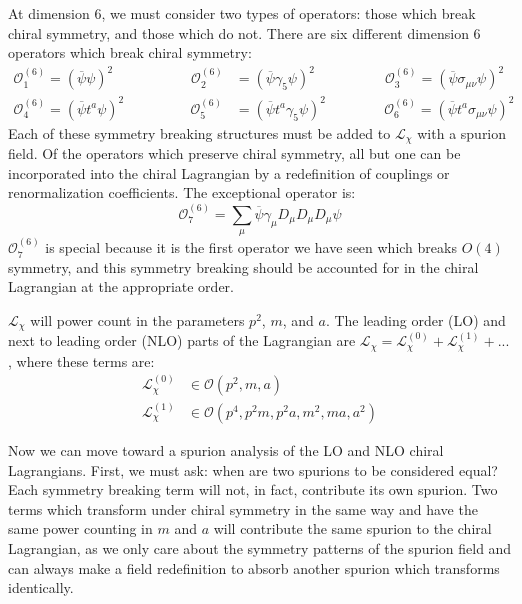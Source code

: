 \documentclass[11pt, oneside]{article}   	%
\theoremstyle{definition}
\begin{document}
At dimension 6, we must consider two types of operators: those which break chiral symmetry, and those which do not. 
There are six different dimension 6 operators which break chiral symmetry:
\begin{align}
        \mathcal O_1^{(6)} = (\overline\psi\psi)^2 \;\;\;\;\;\;\;\;\;\;\;\;\;\;\;\;\;\;\;\; \mathcal O_2^{(6)} &= 
        (\overline\psi\gamma_5\psi)^2\;\;\;\;\;\;\;\;\;\;\;\;\;\;\;\;\;\; \mathcal O_3^{(6)} = (\overline\psi\sigma_{\mu\nu}\psi)^2 
        \nonumber \\ 
        \mathcal O_4^{(6)} = (\overline\psi t^a \psi)^2 \;\;\;\;\;\;\;\;\;\;\;\;\;\;\;\;\;  \mathcal O_5^{(6)} &= (\overline\psi 
        t^a\gamma_5\psi)^2 \;\;\;\;\;\;\;\;\;\;\;\;\;\;\;  \mathcal O_6^{(6)} = (\overline\psi t^a\sigma_{\mu\nu}\psi)^2 ~
        \label{eq:dimension_six}
\end{align}
Each of these symmetry breaking structures must be added to $\mathcal L_\chi$ with a spurion field. Of the operators 
which preserve chiral symmetry, all but one can be incorporated into the chiral Lagrangian by a redefinition of couplings or 
renormalization coefficients. The exceptional operator is:
\begin{equation}
	\mathcal O_7^{(6)} = \sum_\mu\overline\psi\gamma_\mu D_\mu D_\mu D_\mu\psi
\end{equation}
$\mathcal O_7^{(6)}$ is special because it is the first operator we have seen which breaks $O(4)$ symmetry, and this 
symmetry breaking should be accounted for in the chiral Lagrangian at the appropriate order. 

$\mathcal L_\chi$ will power count in the parameters $p^2$, $m$, and $a$. The leading order (LO) and next to leading 
order (NLO) parts of the Lagrangian are $\mathcal L_\chi = \mathcal L_\chi^{(0)} + \mathcal L_\chi^{(1)} + ...$, where these 
terms are:
\begin{align}
    \mathcal L_\chi^{(0)}&\in \mathcal O(p^2, m, a)\nonumber \\
    \mathcal L_\chi^{(1)}&\in \mathcal O(p^4, p^2 m, p^2 a, m^2, ma, a^2)
\end{align}

Now we can move toward a spurion analysis of the LO and NLO chiral Lagrangians. First, we must ask: when are two 
spurions to be considered equal? Each symmetry breaking term will not, in fact, contribute its own spurion. Two 
terms which transform under chiral symmetry in the same way and have the same power counting in $m$ and $a$ will 
contribute the same spurion to the chiral Lagrangian, as we only care about the symmetry patterns of the spurion field and 
can always make a field redefinition to absorb another spurion which transforms identically. 
\end{document}
